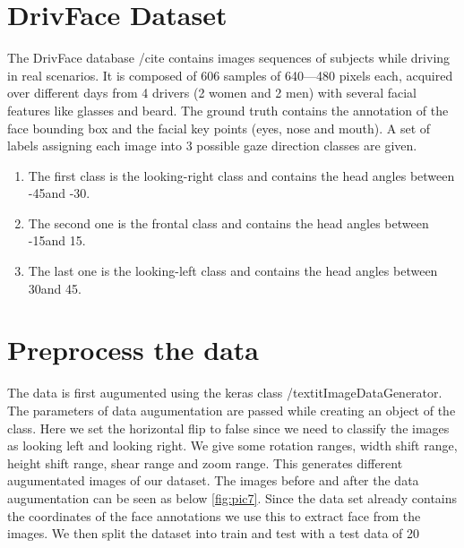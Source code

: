 \documentclass[a4paper, 12pt, oneside, BCOR1cm,toc=chapterentrywithdots]{scrbook}
\begin{document}
\section{DrivFace Dataset}

The DrivFace database /cite{} contains images sequences of subjects while driving in real scenarios. It is composed of 606 samples of 640—480 pixels each, acquired over different days from 4 drivers (2 women and 2 men) with several facial features like glasses and beard. The ground truth contains the annotation of the face bounding box and the facial key points (eyes, nose and mouth). A set of labels assigning each image into 3 possible gaze direction classes are given.

\begin{enumerate}
	\item The first class is the looking-right class and contains the head angles between -45\degree and -30\degree.
	\item The second one is the frontal class and contains the head angles between -15\degree and 15\degree.
	\item The last one is the looking-left class and contains the head angles between 30\degree and 45\degree.
\end{enumerate}

 

\section{Preprocess the data}

The data is first augumented using the keras class /textit{ImageDataGenerator}. The parameters of data augumentation are passed while creating an object of the class. Here we set the horizontal flip to false since we need to classify the images as looking left and looking right. We give some rotation ranges, width shift range, height shift range, shear range and zoom range. This generates different augumentated images of our dataset. The images before and after the data augumentation can be seen as below \ref{fig:pic7}. Since the data set already contains the coordinates of the face annotations we use this to extract face from the images. We then split the dataset into train and test with a test data of 20%
\end{document}
